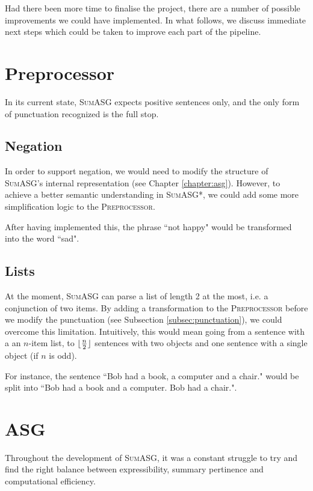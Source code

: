 Had there been more time to finalise the project, there are a number of possible improvements we could have implemented. In what follows, we discuss immediate next steps which could be taken to improve each part of the pipeline.

\section{Preprocessor}

In its current state, \textsc{SumASG} expects positive sentences only, and the only form of punctuation recognized is the full stop.

\subsection{Negation}

In order to support negation, we would need to modify the structure of \textsc{SumASG}'s internal representation (see Chapter \ref{chapter:asg}). However, to achieve a better semantic understanding in \textsc{SumASG*}, we could add some more simplification logic to the \textsc{Preprocessor}.

After having implemented this, the phrase ``not happy" would be transformed into the word ``sad".

\subsection{Lists}

At the moment, \textsc{SumASG} can parse a list of length 2 at the most, i.e. a conjunction of two items. By adding a transformation to the \textsc{Preprocessor} before we modify the punctuation (see Subsection \ref{subsec:punctuation}), we could overcome this limitation. Intuitively, this would mean going from a sentence with a an $n$-item list, to $\lfloor \frac{n}{2} \rfloor$ sentences with two objects and one sentence with a single object (if $n$ is odd).

For instance, the sentence ``Bob had a book, a computer and a chair." would be split into ``Bob had a book and a computer. Bob had a chair.".

\section{ASG}

Throughout the development of \textsc{SumASG}, it was a constant struggle to try and find the right balance between expressibility, summary pertinence and computational efficiency.

